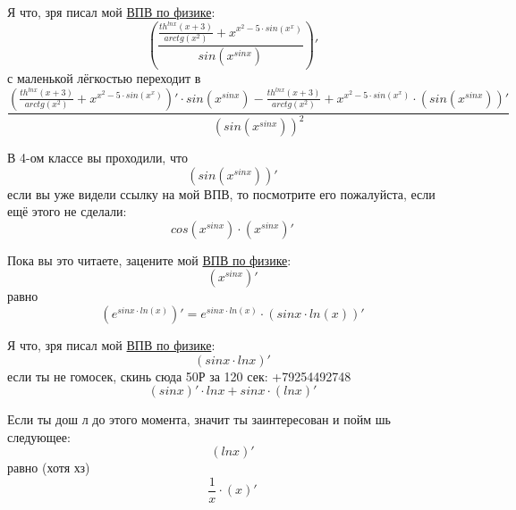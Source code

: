 \documentclass[a4paper, 12pt]{article}
\begin{document}
Я что, зря писал мой \href{https://drive.google.com/drive/folders/1cQOob8lLqhboZnilkguOm7CtLHlbPb1G?usp=sharing}{ВПВ по физике}:
\begin{equation}
\left(\frac{\frac{th^{lnx}\left(x + 3\right)}{arctg\left(x^{2}\right)} + x^{x^{2} - 5 \cdot sin\left(x^{x}\right)}}{sin\left(x^{sinx}\right)} \right)'
\end{equation}
с маленькой лёгкостью переходит в
\begin{equation}
\frac{\left(\frac{th^{lnx}\left(x + 3\right)}{arctg\left(x^{2}\right)} + x^{x^{2} - 5 \cdot sin\left(x^{x}\right)} \right)' \cdot sin\left(x^{sinx}\right) - \frac{th^{lnx}\left(x + 3\right)}{arctg\left(x^{2}\right)} + x^{x^{2} - 5 \cdot sin\left(x^{x}\right)}\cdot \left(sin\left(x^{sinx}\right) \right)'}{\left(sin\left(x^{sinx}\right) \right)^2}
\end{equation}

В 4-ом классе вы проходили, что
\begin{equation}
\left(sin\left(x^{sinx}\right) \right)'
\end{equation}
если вы уже видели ссылку на мой ВПВ, то посмотрите его пожалуйста, если ещё этого не сделали:
\begin{equation}
cos \left( x^{sinx} \right) \cdot \left( x^{sinx} \right)'
\end{equation}

Пока вы это читаете, зацените мой \href{https://drive.google.com/drive/folders/1cQOob8lLqhboZnilkguOm7CtLHlbPb1G?usp=sharing}{ВПВ по физике}:
\begin{equation}
\left(x^{sinx} \right)'
\end{equation}
равно
\begin{equation}
\left(e^{sinx\cdot ln \left(x \right)}  \right)' = e^{sinx\cdot ln \left(x \right)} \cdot \left( sinx\cdot ln \left(x \right) \right)'
\end{equation}

Я что, зря писал мой \href{https://drive.google.com/drive/folders/1cQOob8lLqhboZnilkguOm7CtLHlbPb1G?usp=sharing}{ВПВ по физике}:
\begin{equation}
\left(sinx \cdot lnx \right)'
\end{equation}
если ты не гомосек, скинь сюда 50Р за 120 сек: +79254492748
\begin{equation}
\left(sinx \right)' \cdot lnx + sinx\cdot \left( lnx \right)'
\end{equation}

Если ты дош л до этого момента, значит ты заинтересован и пойм шь следующее:
\begin{equation}
\left(lnx \right)'
\end{equation}
равно (хотя хз)
\begin{equation}
\frac{1}{x} \cdot \left(x \right)'
\end{equation}
\end{document}
